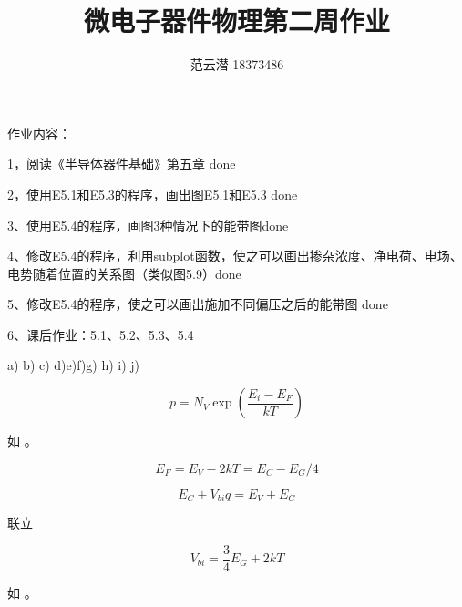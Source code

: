 \documentclass[lang=cn,11pt,a4paper,cite=authoryear]{elegantpaper}
\title{微电子器件物理\quad 第二周作业}
\author{范云潜 18373486}
\institute{微电子学院 184111 班}
\date{\zhtoday}
\begin{document}
\maketitle

作业内容：

1，阅读《半导体器件基础》第五章 done

2，使用E5.1和E5.3的程序，画出图E5.1和E5.3 done

3、使用E5.4的程序，画图3种情况下的能带图done

4、修改E5.4的程序，利用subplot函数，使之可以画出掺杂浓度、净电荷、电场、电势随着位置的关系图（类似图5.9）done

5、修改E5.4的程序，使之可以画出施加不同偏压之后的能带图 done

6、课后作业：5.1、5.2、5.3、5.4

\tableofcontents




% 

% 

% 





a) \XSolidBrush %
 b) \Checkmark c) \XSolidBrush d)\Checkmark e)\Checkmark f)\XSolidBrush g) \Checkmark h) \Checkmark i) \XSolidBrush j) \Checkmark 



\[p = N_V \exp(\frac{E_i-E_F}{kT})\]

如  。


\[E_F = E_V - 2 k T = E_C - E_G / 4\]

\[E_C + V_{bi} q = E_V + E_G\]

联立

\[V_{bi} = \frac{3}{4}E_G + 2 k T\]




如  。
\end{document}
